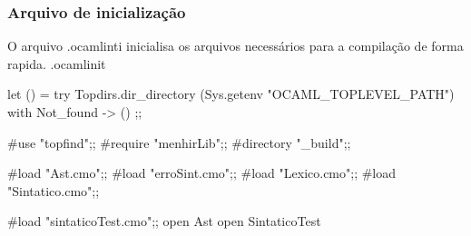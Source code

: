 \documentclass[12pt,a4paper,twoside]{article}
\begin{document}
\subsubsection{Arquivo de inicialização}
O arquivo .ocamlinti inicialisa os arquivos necessários para a compilação de forma rapida.
\newline
.ocamlinit
\begin{terminal}
let () =
    try Topdirs.dir_directory (Sys.getenv "OCAML_TOPLEVEL_PATH")
    with Not_found -> ()
;;

#use "topfind";;
#require "menhirLib";;
#directory "_build";;

#load "Ast.cmo";;
#load "erroSint.cmo";;
#load "Lexico.cmo";;
#load "Sintatico.cmo";;

#load "sintaticoTest.cmo";;
open Ast
open SintaticoTest
\end{terminal}
\end{document}
